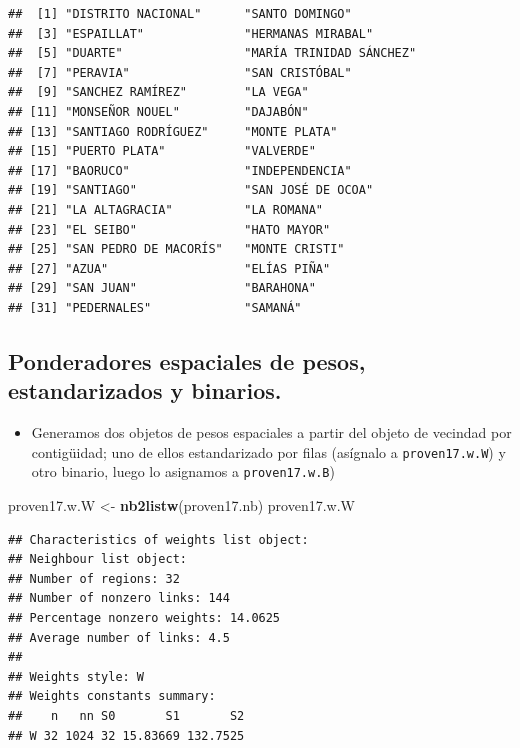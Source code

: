 \documentclass[11pt,]{article}
\newenvironment{Shaded}{\begin{snugshade}}{\end{snugshade}}
\newcommand{\KeywordTok}[1]{\textcolor[rgb]{0.13,0.29,0.53}{\textbf{#1}}}
\newcommand{\StringTok}[1]{\textcolor[rgb]{0.31,0.60,0.02}{#1}}
\newcommand{\NormalTok}[1]{#1}
\providecommand{\tightlist}{%
\setlength{\itemsep}{0pt}\setlength{\parskip}{0pt}}
\begin{document}
\begin{verbatim}
##  [1] "DISTRITO NACIONAL"      "SANTO DOMINGO"         
##  [3] "ESPAILLAT"              "HERMANAS MIRABAL"      
##  [5] "DUARTE"                 "MARÍA TRINIDAD SÁNCHEZ"
##  [7] "PERAVIA"                "SAN CRISTÓBAL"         
##  [9] "SANCHEZ RAMÍREZ"        "LA VEGA"               
## [11] "MONSEÑOR NOUEL"         "DAJABÓN"               
## [13] "SANTIAGO RODRÍGUEZ"     "MONTE PLATA"           
## [15] "PUERTO PLATA"           "VALVERDE"              
## [17] "BAORUCO"                "INDEPENDENCIA"         
## [19] "SANTIAGO"               "SAN JOSÉ DE OCOA"      
## [21] "LA ALTAGRACIA"          "LA ROMANA"             
## [23] "EL SEIBO"               "HATO MAYOR"            
## [25] "SAN PEDRO DE MACORÍS"   "MONTE CRISTI"          
## [27] "AZUA"                   "ELÍAS PIÑA"            
## [29] "SAN JUAN"               "BARAHONA"              
## [31] "PEDERNALES"             "SAMANÁ"
\end{verbatim}

\subsection{Ponderadores espaciales de pesos, estandarizados y
binarios.}\label{ponderadores-espaciales-de-pesos-estandarizados-y-binarios.}

\begin{itemize}
\tightlist
\item
  Generamos dos objetos de pesos espaciales a partir del objeto de
  vecindad por contigüidad; uno de ellos estandarizado por filas
  (asígnalo a \texttt{proven17.w.W}) y otro binario, luego lo asignamos
  a \texttt{proven17.w.B})
\end{itemize}

\begin{Shaded}
\begin{Highlighting}[]
\NormalTok{proven17.w.W <-}\StringTok{ }\KeywordTok{nb2listw}\NormalTok{(proven17.nb)}
\NormalTok{proven17.w.W}
\end{Highlighting}
\end{Shaded}

\begin{verbatim}
## Characteristics of weights list object:
## Neighbour list object:
## Number of regions: 32 
## Number of nonzero links: 144 
## Percentage nonzero weights: 14.0625 
## Average number of links: 4.5 
## 
## Weights style: W 
## Weights constants summary:
##    n   nn S0       S1       S2
## W 32 1024 32 15.83669 132.7525
\end{verbatim}
\end{document}
